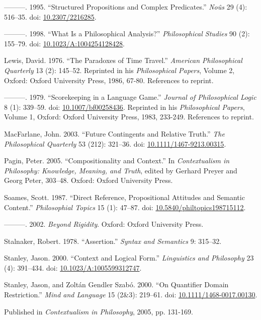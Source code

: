 \documentclass[
  10pt,
  letterpaper,
  DIV=11,
  numbers=noendperiod,
  twoside]{scrartcl}
\newlength{\cslhangindent}
\newenvironment{CSLReferences}[2] %
 {\begin{list}{}{%
  \setlength{\itemindent}{0pt}
  \setlength{\leftmargin}{0pt}
  \setlength{\parsep}{0pt}
  \ifodd #1
   \setlength{\leftmargin}{\cslhangindent}
   \setlength{\itemindent}{-1\cslhangindent}
  \fi
  \setlength{\itemsep}{#2\baselineskip}}}
 {\end{list}}
\begin{document}
\begin{CSLReferences}{1}{0}
---------. 1995. {``Structured Propositions and Complex Predicates.''}
\emph{No{û}s} 29 (4): 516--35. doi:
\href{https://doi.org/10.2307/2216285}{10.2307/2216285}.

---------. 1998. {``What Is a Philosophical Analysis?''}
\emph{Philosophical Studies} 90 (2): 155--79. doi:
\href{https://doi.org/10.1023/A:1004254128428}{10.1023/A:1004254128428}.

Lewis, David. 1976. {``The Paradoxes of Time Travel.''} \emph{American
Philosophical Quarterly} 13 (2): 145--52. Reprinted in his
\emph{Philosophical Papers}, Volume 2, Oxford: Oxford University Press,
1986, 67-80. References to reprint.

---------. 1979. {``Scorekeeping in a Language Game.''} \emph{Journal of
Philosophical Logic} 8 (1): 339--59. doi:
\href{https://doi.org/10.1007/bf00258436}{10.1007/bf00258436}. Reprinted
in his \emph{Philosophical Papers}, Volume 1, Oxford: Oxford University
Press, 1983, 233-249. References to reprint.

MacFarlane, John. 2003. {``{Future Contingents and Relative Truth}.''}
\emph{The Philosophical Quarterly} 53 (212): 321--36. doi:
\href{https://doi.org/10.1111/1467-9213.00315}{10.1111/1467-9213.00315}.

Pagin, Peter. 2005. {``Compositionality and Context.''} In
\emph{Contextualism in Philosophy: Knowledge, Meaning, and Truth},
edited by Gerhard Preyer and Georg Peter, 303--48. Oxford: Oxford
University Press.

Soames, Scott. 1987. {``Direct Reference, Propositional Attitudes and
Semantic Content.''} \emph{Philosophial Topics} 15 (1): 47--87. doi:
\href{https://doi.org/10.5840/philtopics198715112}{10.5840/philtopics198715112}.

---------. 2002. \emph{Beyond Rigidity}. Oxford: Oxford University
Press.

Stalnaker, Robert. 1978. {``Assertion.''} \emph{Syntax and Semantics} 9:
315--32.

Stanley, Jason. 2000. {``{Context and Logical Form}.''}
\emph{Linguistics and Philosophy} 23 (4): 391--434. doi:
\href{https://doi.org/10.1023/A:1005599312747}{10.1023/A:1005599312747}.

Stanley, Jason, and Zoltán Gendler Szabó. 2000. {``{On Quantifier Domain
Restriction}.''} \emph{Mind and Language} 15 (2\&3): 219--61. doi:
\href{https://doi.org/10.1111/1468-0017.00130}{10.1111/1468-0017.00130}.

\end{CSLReferences}



\noindent Published in\emph{
Contextualism in Philosophy}, 2005, pp. 131-169.
\end{document}

